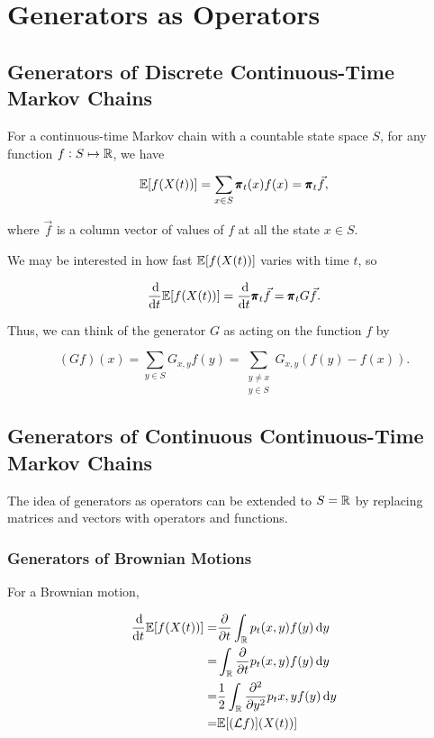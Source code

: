 \section{Generators as Operators}

\subsection{Generators of Discrete Continuous-Time Markov Chains}

For a continuous-time Markov chain with a countable state space $S$, for any function $f: S \mapsto \mathbb{R}$, we have 

\begin{equation*}
    \mathbb{E} [f(X(t))] = \sum_{x \in S} \pmb{\pi}_t(x) f(x) = \pmb{\pi}_t \vec{f},
\end{equation*}

where $\vec{f}$ is a column vector of values of $f$ at all the state $x \in S$.

We may be interested in how fast $\mathbb{E} [f(X(t))]$ varies with time $t$, so 

\begin{equation*}
    \frac{\dif}{\dif t} \E [f(X(t))] = \frac{\dif}{\dif t}\mbf{\pi}_t \vec{f} = \mbf{\pi}_t G \vec{f}.
\end{equation*}

Thus, we can think of the generator $G$ as acting on the function $f$ by 

\begin{equation*}
    (Gf) (x) = \sum_{y \in S} G_{x, y} f(y) = \sum_{\substack{y \neq x \\ y \in S}} G_{x, y} (f(y) - f(x)).
\end{equation*}

\subsection{Generators of Continuous Continuous-Time Markov Chains}

The idea of generators as operators can be extended to $S = \mathbb{R}$ by replacing matrices and vectors with operators and functions.

\subsubsection{Generators of Brownian Motions}
 For a Brownian motion,

\begin{align*}
    \frac{\dif}{\dif t} \E [f(X(t))] = & \frac{\partial}{\partial t} \int_\mbb{R} p_t(x, y) f(y) \dif y \\ 
    = & \int_\mbb{R} \frac{\partial}{\partial t} p_t(x, y) f(y) \dif y \\ 
    = & \frac{1}{2} \int_\mbb{R} \frac{\partial^2}{\partial y^2} p_t{x, y} f(y) \dif y \\ 
    = & \E [(\mathcal{L}f)](X(t))]
\end{align*}

